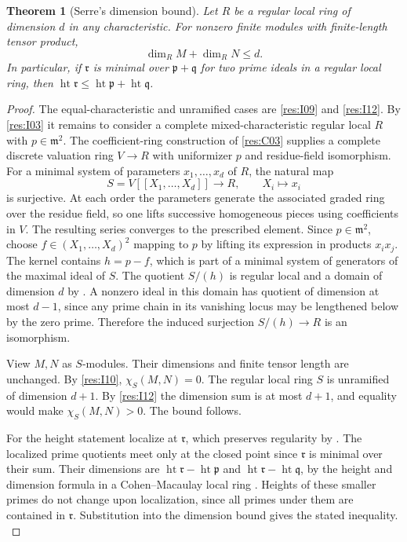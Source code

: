 \documentclass[11pt,oneside,openany]{book}
\newtheorem{theorem}{Theorem}[chapter]
\theoremstyle{definition}
\theoremstyle{remark}
\begin{document}
\begin{theorem}[Serre's dimension bound]\label{res:I13}
Let \(R\) be a regular local ring of dimension \(d\) in any
characteristic. For nonzero finite modules with finite-length
tensor product,
\[
 \dim_R M+\dim_R N\le d.
\]
In particular, if \(\mathfrak r\) is minimal over
\(\mathfrak p+\mathfrak q\) for two prime ideals in a regular
local ring, then
\(\operatorname{ht}\mathfrak r\le
  \operatorname{ht}\mathfrak p+\operatorname{ht}\mathfrak q\).
\end{theorem}
\begin{proof}
The equal-characteristic and unramified cases are
\ref{res:I09} and \ref{res:I12}. By \ref{res:I03} it remains
to consider a complete mixed-characteristic regular local \(R\)
with \(p\in\mathfrak m^2\). The coefficient-ring construction
of \ref{res:C03} supplies a complete discrete valuation ring
\(V\to R\) with uniformizer \(p\) and residue-field isomorphism.
For a minimal system of parameters \(x_1,\ldots,x_d\) of \(R\),
the natural map
\[
 S=V[[X_1,\ldots,X_d]]\longrightarrow R,\qquad X_i\longmapsto x_i
\]
is surjective. At each order the parameters generate the
associated graded ring over the residue field, so one lifts
successive homogeneous pieces using coefficients in \(V\).
The resulting series converges to the prescribed element.
Since \(p\in\mathfrak m^2\), choose \(f\in (X_1,\ldots,X_d)^2\)
mapping to \(p\) by lifting its expression in products \(x_ix_j\).
The kernel contains \(h=p-f\), which is part of a minimal
system of generators of the maximal ideal of \(S\).
The quotient \(S/(h)\) is regular local and a domain of
dimension \(d\) by \cite[ALG-05-C03-S03]{p103}. A nonzero
ideal in this domain has quotient of dimension at most
\(d-1\), since any prime chain in its vanishing locus may be
lengthened below by the zero prime. Therefore the induced
surjection \(S/(h)\to R\) is an isomorphism.

View \(M,N\) as \(S\)-modules. Their dimensions and finite
tensor length are unchanged. By \ref{res:I10},
\(\chi_S(M,N)=0\). The regular local ring \(S\) is unramified
of dimension \(d+1\). By \ref{res:I12} the dimension sum is
at most \(d+1\), and equality would make \(\chi_S(M,N)>0\).
The bound follows.

For the height statement localize at \(\mathfrak r\), which
preserves regularity by \cite[CM-19]{core}. The localized
prime quotients meet only at the closed point since
\(\mathfrak r\) is minimal over their sum. Their dimensions are
\(\operatorname{ht}\mathfrak r-\operatorname{ht}\mathfrak p\)
and \(\operatorname{ht}\mathfrak r-\operatorname{ht}\mathfrak q\),
by the height and dimension formula in a Cohen--Macaulay local
ring \cite[CM-07]{core}. Heights of these smaller primes do
not change upon localization, since all primes under them
are contained in \(\mathfrak r\). Substitution into the
dimension bound gives the stated inequality.
\cite[Chapter V, \S B.6]{serre-local}
\end{proof}
\end{document}

